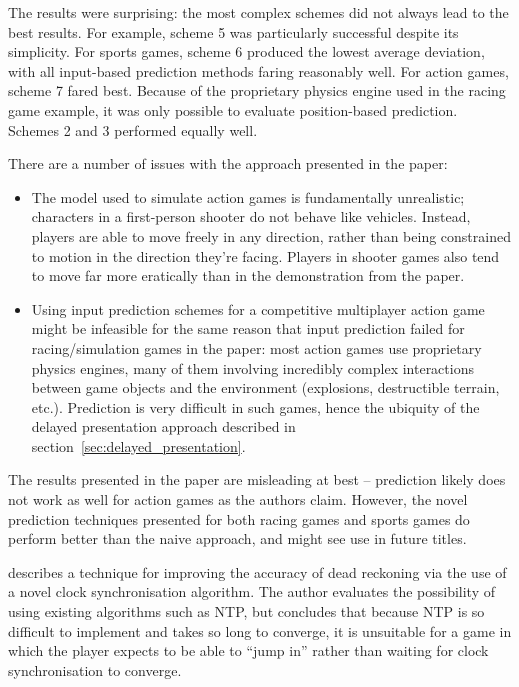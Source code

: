 \documentclass[conference]{IEEEtran}
\begin{document}
	The results were surprising: the most complex schemes did not always lead to the best results. For example, scheme 5 was particularly successful despite its simplicity. For sports games, scheme 6 produced the lowest average deviation, with all input-based prediction methods faring reasonably well. For action games, scheme 7 fared best. Because of the proprietary physics engine used in the racing game example, it was only possible to evaluate position-based prediction. Schemes 2 and 3 performed equally well.

	There are a number of issues with the approach presented in the paper:

	\begin{itemize}
		\item The model used to simulate action games is fundamentally unrealistic; characters in a first-person shooter do not behave like vehicles. Instead, players are able to move freely in any direction, rather than being constrained to motion in the direction they're facing. Players in shooter games also tend to move far more eratically than in the demonstration from the paper.
		\item Using input prediction schemes for a competitive multiplayer action game might be infeasible for the same reason that input prediction failed for racing/simulation games in the paper: most action games use proprietary physics engines, many of them involving incredibly complex interactions between game objects and the environment (explosions, destructible terrain, etc.). Prediction is very difficult in such games, hence the ubiquity of the delayed presentation approach described in section~\ref{sec:delayed_presentation}.
	\end{itemize}

	The results presented in the paper are misleading at best -- prediction likely does not work as well for action games as the authors claim. However, the novel prediction techniques presented for both racing games and sports games do perform better than the naive approach, and might see use in future titles.

	\Textcite{Simpson2000} describes a technique for improving the accuracy of dead reckoning via the use of a novel clock synchronisation algorithm. The author evaluates the possibility of using existing algorithms such as NTP, but concludes that because NTP is so difficult to implement and takes so long to converge, it is unsuitable for a game in which the player expects to be able to ``jump in'' rather than waiting for clock synchronisation to converge.
\end{document}
